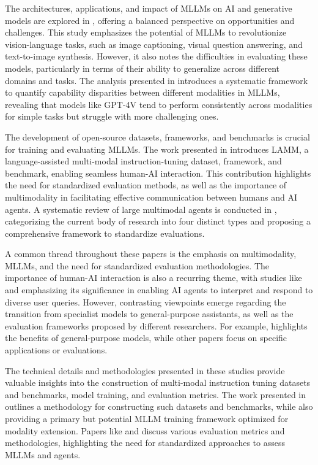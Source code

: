 \documentclass[conference]{IEEEtran}
\begin{document}
The architectures, applications, and impact of MLLMs on AI and generative models are explored in \cite{b2}, offering a balanced perspective on opportunities and challenges. This study emphasizes the potential of MLLMs to revolutionize vision-language tasks, such as image captioning, visual question answering, and text-to-image synthesis. However, it also notes the difficulties in evaluating these models, particularly in terms of their ability to generalize across different domains and tasks. The analysis presented in \cite{b3} introduces a systematic framework to quantify capability disparities between different modalities in MLLMs, revealing that models like GPT-4V tend to perform consistently across modalities for simple tasks but struggle with more challenging ones.

The development of open-source datasets, frameworks, and benchmarks is crucial for training and evaluating MLLMs. The work presented in \cite{b4} introduces LAMM, a language-assisted multi-modal instruction-tuning dataset, framework, and benchmark, enabling seamless human-AI interaction. This contribution highlights the need for standardized evaluation methods, as well as the importance of multimodality in facilitating effective communication between humans and AI agents. A systematic review of large multimodal agents is conducted in \cite{b5}, categorizing the current body of research into four distinct types and proposing a comprehensive framework to standardize evaluations.

A common thread throughout these papers is the emphasis on multimodality, MLLMs, and the need for standardized evaluation methodologies. The importance of human-AI interaction is also a recurring theme, with studies like \cite{b4} and \cite{b5} emphasizing its significance in enabling AI agents to interpret and respond to diverse user queries. However, contrasting viewpoints emerge regarding the transition from specialist models to general-purpose assistants, as well as the evaluation frameworks proposed by different researchers. For example, \cite{b1} highlights the benefits of general-purpose models, while other papers focus on specific applications or evaluations.

The technical details and methodologies presented in these studies provide valuable insights into the construction of multi-modal instruction tuning datasets and benchmarks, model training, and evaluation metrics. The work presented in \cite{b4} outlines a methodology for constructing such datasets and benchmarks, while also providing a primary but potential MLLM training framework optimized for modality extension. Papers like \cite{b5} and \cite{b2} discuss various evaluation metrics and methodologies, highlighting the need for standardized approaches to assess MLLMs and agents.
\end{document}
